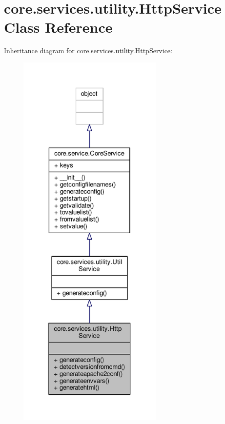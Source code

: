 \hypertarget{classcore_1_1services_1_1utility_1_1_http_service}{\section{core.\+services.\+utility.\+Http\+Service Class Reference}
\label{classcore_1_1services_1_1utility_1_1_http_service}
}


Inheritance diagram for core.\+services.\+utility.\+Http\+Service\+:
\nopagebreak
\begin{figure}[H]
\begin{center}
\leavevmode
\includegraphics[height=550pt]{classcore_1_1services_1_1utility_1_1_http_service__inherit__graph}
\end{center}
\end{figure}


